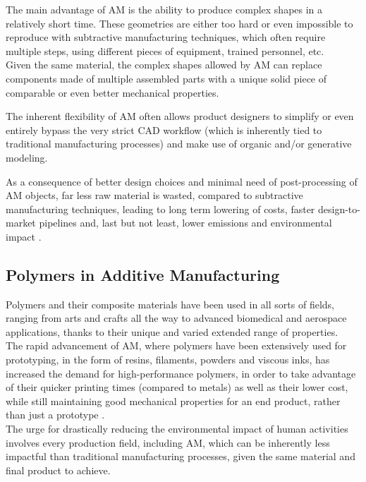 \documentclass{article}
\begin{document}
    The main advantage of AM is the ability to produce complex shapes in a relatively short time. 
    These geometries are either too hard or even impossible to reproduce with subtractive manufacturing techniques, which often require multiple steps, using different 
    pieces of equipment, trained personnel, etc. \\

    Given the same material, the complex shapes allowed by AM can replace components made of multiple assembled parts with a unique solid piece of comparable or even better mechanical properties. 
    
    The inherent flexibility of AM often allows product designers to simplify or even entirely bypass the very strict CAD workflow (which is inherently tied to 
    traditional manufacturing processes) and make use of organic and/or generative modeling. 

    As a consequence of better design choices and minimal need of post-processing of AM objects, far less raw material is wasted, compared to subtractive manufacturing techniques, leading to 
    long term lowering of costs, faster design-to-market pipelines and, last but not least, lower emissions and environmental impact \autocite*{Recent_progress_polymers_AM}. 

    \subsection{Polymers in Additive Manufacturing\label{Polymers_in_AM}}

    Polymers and their composite materials have been used in all sorts of fields, ranging from arts and crafts all the way to advanced biomedical and aerospace applications, thanks 
    to their unique and varied extended range of properties. \\  
    
    The rapid advancement of AM, where polymers have been extensively used for prototyping, in the form of resins, filaments, powders and viscous inks, 
    has increased the demand for high-performance polymers, in order to take advantage of their quicker printing times (compared to metals) as well as their lower cost, while still
    maintaining good mechanical properties for an end product, rather than just a prototype \autocite*{Recent_progress_polymers_AM}. \\ 

    The urge for drastically reducing the environmental impact of human activities involves every production field, including AM, which can be inherently less impactful
    than traditional manufacturing processes, given the same material and final product to achieve. 
\end{document}
